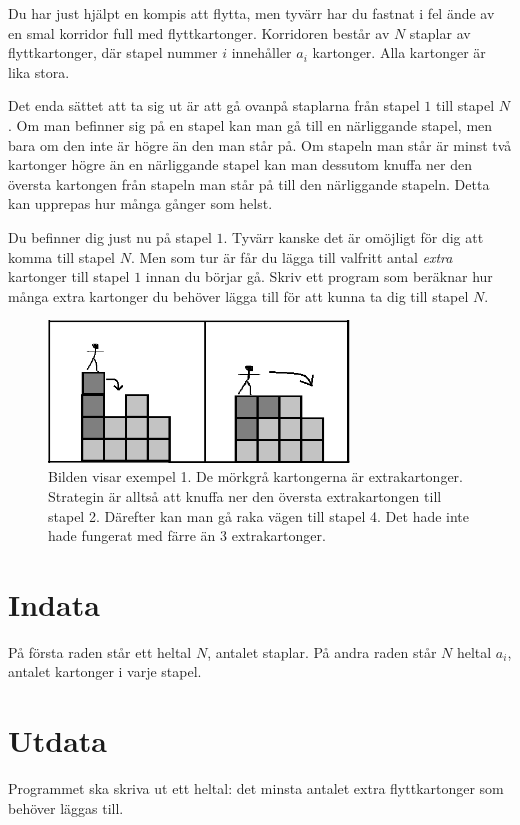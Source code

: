 
Du har just hjälpt en kompis att flytta, men tyvärr har du fastnat i
fel ände av en smal korridor full med flyttkartonger. Korridoren
består av $N$ staplar av flyttkartonger, där stapel nummer $i$
innehåller $a_i$ kartonger. Alla kartonger är lika stora.

Det enda sättet att ta sig ut är att gå ovanpå staplarna från stapel
$1$ till stapel $N$. Om man befinner sig på en stapel kan man gå till
en närliggande stapel, men bara om den inte är högre än den man står
på. Om stapeln man står är minst två kartonger högre än en närliggande
stapel kan man dessutom knuffa ner den översta kartongen från stapeln
man står på till den närliggande stapeln. Detta kan upprepas hur många
gånger som helst. 

Du befinner dig just nu på stapel $1$. Tyvärr kanske det är omöjligt
för dig att komma till stapel $N$. Men som tur är får du lägga till
valfritt antal {\em extra} kartonger till stapel $1$ innan du börjar gå. Skriv ett program som
beräknar hur många extra kartonger du behöver lägga till för att kunna
ta dig till stapel $N$.

\begin{figure}[!h]
\begin{center}
\includegraphics[width=8cm]{kartongbild2.png}
\end{center}
\caption{Bilden visar exempel 1. De mörkgrå kartongerna är extrakartonger. Strategin är alltså att knuffa ner den översta extrakartongen till stapel 2. Därefter kan man gå raka vägen till stapel 4. Det hade inte hade fungerat med färre än 3 extrakartonger.}
\end{figure}

\section*{Indata}
På första raden står ett heltal $N$, antalet staplar. På andra raden står $N$ heltal $a_i$, antalet kartonger i varje stapel. 

\section*{Utdata}
Programmet ska skriva ut ett heltal: det minsta antalet extra flyttkartonger som behöver läggas till.


